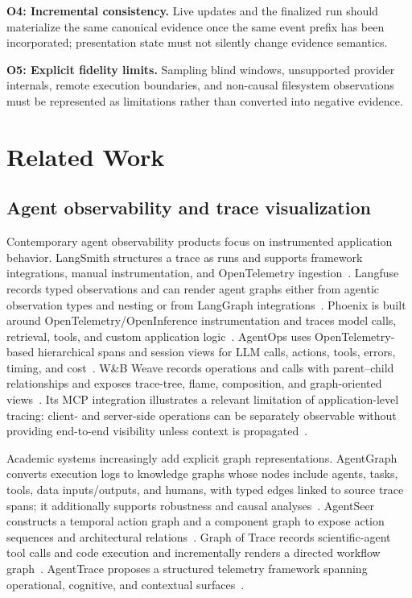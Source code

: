 \textbf{O4: Incremental consistency.} Live updates and the finalized run should materialize the same canonical evidence once the same event prefix has been incorporated; presentation state must not silently change evidence semantics.

\textbf{O5: Explicit fidelity limits.} Sampling blind windows, unsupported provider internals, remote execution boundaries, and non-causal filesystem observations must be represented as limitations rather than converted into negative evidence.

\section{Related Work}
\subsection{Agent observability and trace visualization}
Contemporary agent observability products focus on instrumented application behavior. LangSmith structures a trace as runs and supports framework integrations, manual instrumentation, and OpenTelemetry ingestion~\cite{langsmith2026observability,langsmith2026otel}. Langfuse records typed observations and can render agent graphs either from agentic observation types and nesting or from LangGraph integrations~\cite{langfuse2026agentgraphs}. Phoenix is built around OpenTelemetry/OpenInference instrumentation and traces model calls, retrieval, tools, and custom application logic~\cite{phoenix2026tracing}. AgentOps uses OpenTelemetry-based hierarchical spans and session views for LLM calls, actions, tools, errors, timing, and cost~\cite{agentops2026core}. W\&B Weave records operations and calls with parent--child relationships and exposes trace-tree, flame, composition, and graph-oriented views~\cite{wandb2026tracing,wandb2026traceview}. Its MCP integration illustrates a relevant limitation of application-level tracing: client- and server-side operations can be separately observable without providing end-to-end visibility unless context is propagated~\cite{wandb2026mcp}.

Academic systems increasingly add explicit graph representations. AgentGraph converts execution logs to knowledge graphs whose nodes include agents, tasks, tools, data inputs/outputs, and humans, with typed edges linked to source trace spans; it additionally supports robustness and causal analyses~\cite{wu2026agentgraph}. AgentSeer constructs a temporal action graph and a component graph to expose action sequences and architectural relations~\cite{wicaksono2026agentseer}. Graph of Trace records scientific-agent tool calls and code execution and incrementally renders a directed workflow graph~\cite{gao2026graphtrace}. AgentTrace proposes a structured telemetry framework spanning operational, cognitive, and contextual surfaces~\cite{alsayyad2026agenttrace}.

